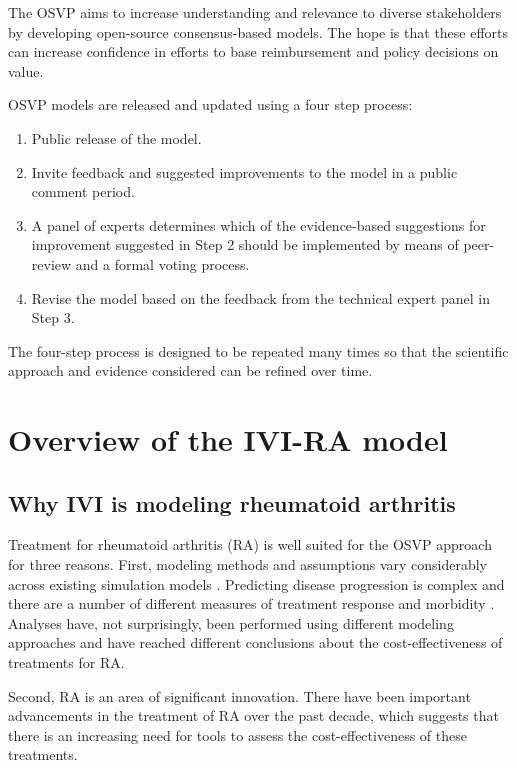 \documentclass[11pt,final,fleqn]{article}
\theoremstyle{plain}
\begin{document}
The OSVP aims to increase understanding and relevance to diverse stakeholders by developing open-source consensus-based models. The hope is that these efforts can increase confidence in efforts to base reimbursement and policy decisions on value.

OSVP models are released and updated using a four step process:

\begin{enumerate}
\item Public release of the model.
\item Invite feedback and suggested improvements to the model in a public comment period.
\item A panel of experts determines which of the evidence-based suggestions for improvement suggested in Step 2 should be implemented by means of peer-review and a formal voting process. 
\item Revise the model based on the feedback from the technical expert panel in Step 3. 
\end{enumerate}

The four-step process is designed to be repeated many times so that the scientific approach and evidence considered can be refined over time.

\section{Overview of the IVI-RA model}\label{sec:overview-ra}

\subsection{Why IVI is modeling rheumatoid arthritis}
Treatment for rheumatoid arthritis (RA) is well suited for the OSVP approach for three reasons. First, modeling methods and assumptions vary considerably across existing simulation models  \citep{brennan2003modelling, wailoo2008biologic, tosh2011sheffield, carlson2015economic, stephens2015modelling, athanasakis2015cost, stevenson2016adalimumab, icer2017tim, stevenson2017cost}. Predicting disease progression is complex and there are a number of different measures of treatment response and morbidity \citep{madan2015consensus}. Analyses have, not surprisingly, been performed using different modeling approaches and have reached different conclusions about the cost-effectiveness of treatments for RA. 

Second, RA is an area of significant innovation. There have been important advancements in the treatment of RA over the past decade, which suggests that there is an increasing need for tools to assess the cost-effectiveness of these treatments.
\end{document}
